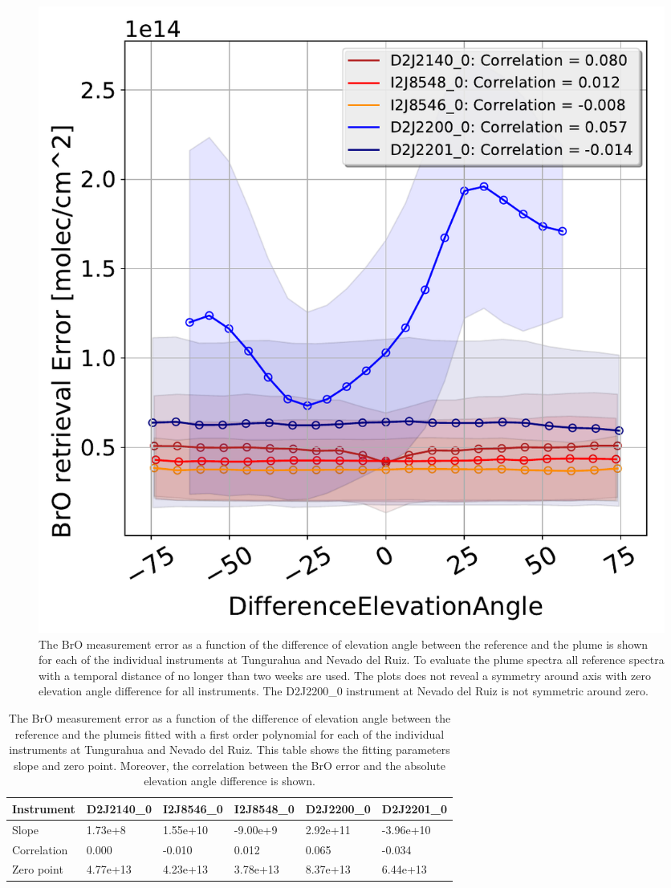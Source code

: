 \begin{figure}
	\centering
	\includegraphics[width=0.7\linewidth]{Bilder/DiffElevAngleallInstruments}
	\caption{The BrO measurement error as a function of the difference of elevation angle between the reference and the plume is shown for each of the individual instruments at Tungurahua and Nevado del Ruiz. To evaluate the plume spectra all reference spectra with a temporal distance of no longer than two weeks are used. The plots does not reveal a symmetry around axis with zero elevation angle difference for all instruments. The D2J2200\_0 instrument at Nevado del Ruiz is not symmetric around zero.}
	\label{fig:diffeleangle}
\end{figure}
\begin{table}[h]
	\begin{tabular}{|p{2cm}|p{2cm}|p{2cm}|p{2cm}|p{2cm}|p{2cm}|}
		Instrument	&D2J2140\_0&I2J8546\_0& I2J8548\_0&D2J2200\_0&D2J2201\_0\\
		\toprule
		Slope& 1.73e+8& 1.55e+10  &-9.00e+9 &2.92e+11&-3.96e+10\\
		\midrule
		Correlation&
		0.000&
		-0.010&
		0.012&
		0.065&
		-0.034\\
		\midrule
		Zero point&4.77e+13&4.23e+13&3.78e+13&8.37e+13 &6.44e+13 \\
		\bottomrule
	\end{tabular}
	\caption{The BrO measurement error as a function of the difference of elevation angle between the reference and the plumeis fitted with a first order polynomial for each of the individual instruments at Tungurahua and Nevado del Ruiz. This table shows the fitting parameters slope and zero point. Moreover, the correlation between the BrO error and the absolute elevation angle difference is shown. }
\end{table}
